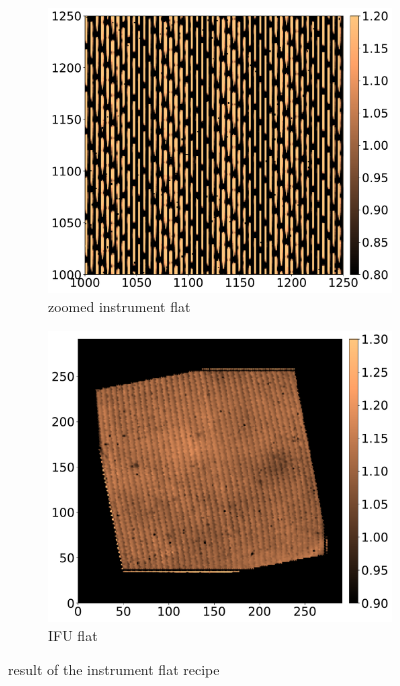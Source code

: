 \documentclass[twoside,single]{lion-msc}
\begin{document}
\begin{figure}[!b]
\centering
\begin{subfigure}{.48\textwidth}
  \centering
  \includegraphics[width=1\linewidth]{instrumentflat}
  \caption{zoomed instrument flat}
\end{subfigure}\hfill
\begin{subfigure}{.48\textwidth}
  \centering
  \includegraphics[width=1\linewidth]{IFU_flat}
  \caption{IFU flat}
\end{subfigure}
\caption{result of the instrument flat recipe}
\label{fig:instrumentflatrecipe}
\end{figure}
\end{document}
